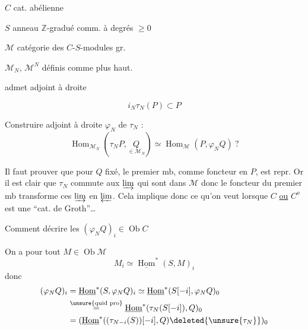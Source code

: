 $C$ cat. abélienne

$S$ anneau $\mathbb Z$-gradué comm. à degrés $\geq0$

$\mathcal M$  catégorie des $C$-$S$-modules gr. \uline{}

$\mathcal M_N$, $\mathcal M^N$ définis comme plus haut.


admet  adjoint à droite

\[ i_N\tau_N(P)\subset P \]


Construire adjoint à droite $\varphi_N$ de $\tau_N$ :
\[
\operatorname{Hom}_{\mathcal M_N}(\tau_NP,\underset{\in\mathcal M_N}{Q})\simeq
\operatorname{Hom}_{\mathcal M}(P,\varphi_NQ)\ ?
\]

Il faut  prouver que pour $Q$ fixé, le premier mb, comme foncteur en $P$, est repr. Or il est clair que $\tau_N$ commute aux $\varinjlim$ qui sont  dans $\mathcal M$ donc le foncteur du premier mb transforme ces $\varinjlim$ en $\varprojlim$. Cela implique donc ce qu'on veut lorsque $C$ \uline{ou} $C^o$ est une ``cat. de Groth''\ldots

Comment  décrire les $(\varphi_NQ)_i\in\operatorname{Ob}C$

On a pour tout $M\in\operatorname{Ob}\mathcal M$
\[ M_i\simeq\underline{\operatorname{Hom}}^*(S,M)_i \]
donc
\[
\begin{aligned}
(\varphi_NQ)_i&=\underline{\operatorname{Hom}}^*(S,\varphi_NQ)_i
\simeq\underline{\operatorname{Hom}}^*(S[-i],\varphi_NQ)_0\\
&\overset{\unsure{\text{quid pro}}}{=}\underline{\operatorname{Hom}}^*(\tau_N(S[-i]),Q)_0\\
&=(\underline{\operatorname{Hom}}^*((\tau_{N-i}(S))[-i],Q)\deleted{\unsure{\tau_N}})_0
\end{aligned}
\]
